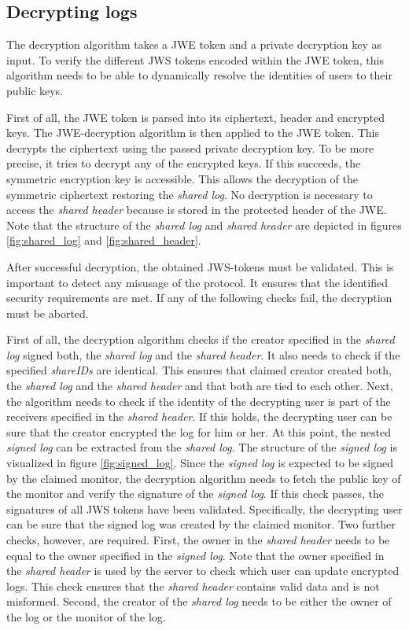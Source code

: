 \documentclass[../main.tex]{subfiles}
\begin{document}
\subsection{Decrypting logs}
\label{sec:decrypting}

The decryption algorithm takes a JWE token and a private decryption key as input.
To verify the different JWS tokens encoded within the JWE token, this algorithm needs to be able to dynamically resolve the identities of users to their public keys.

First of all, the JWE token is parsed into its ciphertext, header and encrypted keys.
The JWE-decryption algorithm is then applied to the JWE token.
This decrypts the ciphertext using the passed private decryption key.
To be more precise, it tries to decrypt any of the encrypted keys.
If this succeeds, the symmetric encryption key is accessible.
This allows the decryption of the symmetric ciphertext restoring the \textit{shared log}.
No decryption is necessary to access the \textit{shared header} because is stored in the protected header of the JWE.
Note that the structure of the \textit{shared log} and \textit{shared header} are depicted in figures \ref{fig:shared_log} and \ref{fig:shared_header}.

After successful decryption, the obtained JWS-tokens must be validated.
This is important to detect any misusage of the protocol.
It ensures that the identified security requirements are met.
If any of the following checks fail, the decryption must be aborted.

First of all, the decryption algorithm checks if the creator specified in the \textit{shared log} signed both, the \textit{shared log} and the \textit{shared header}.
It also needs to check if the specified \textit{shareIDs} are identical.
This ensures that claimed creator created both, the \textit{shared log} and the \textit{shared header} and that both are tied to each other.
Next, the algorithm needs to check if the identity of the decrypting user is part of the receivers specified in the \textit{shared header}.
If this holds, the decrypting user can be sure that the creator encrypted the log for him or her.
At this point, the nested \textit{signed log} can be extracted from the \textit{shared log}.
The structure of the \textit{signed log} is visualized in figure \ref{fig:signed_log}.
Since the \textit{signed log} is expected to be signed by the claimed monitor, the decryption algorithm needs to fetch the public key of the monitor and verify the signature of the \textit{signed log}.
If this check passes, the signatures of all JWS tokens have been validated.
Specifically, the decrypting user can be sure that the signed log was created by the claimed monitor.
Two further checks, however, are required.
First, the owner in the \textit{shared header} needs to be equal to the owner specified in the \textit{signed log}.
Note that the owner specified in the \textit{shared header} is used by the server to check which user can update encrypted logs.
This check ensures that the \textit{shared header} contains valid data and is not misformed.
Second, the creator of the \textit{shared log} needs to be either the owner of the log or the monitor of the log.
\end{document}
